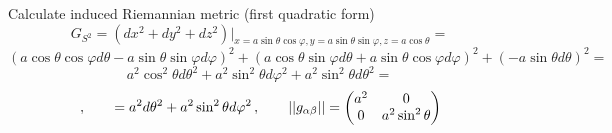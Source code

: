 \documentclass[12pt]{article}
\theoremstyle{theorem}
\numberwithin{equation}{section}
\begin{document}
   Calculate induced Riemannian metric (first quadratic form)
              $$
              G_{S^2}=\left(dx^2+dy^2+dz^2\right)\big\vert_{x=a\sin\theta\cos\varphi,y=a\sin\theta\sin\varphi,
              z=a\cos\theta}=
                      $$
                      $$
                      (a\cos\theta\cos\varphi d\theta-a\sin\theta\sin\varphi d\varphi)^2+
                      (a\cos\theta\sin\varphi d\theta+a\sin\theta\cos\varphi d\varphi)^2+
                         (-a\sin\theta d\theta)^2=
                      $$
                      $$
          a^2\cos^2\theta d\theta^2+a^2\sin^2\theta d\varphi^2+a^2\sin^2\theta d\theta^2=
                      $$
        \begin{equation}\label{firtsquadraticformforsphere(diff)}\,,\qquad
             =a^2d\theta^2+a^2\sin^2\theta d\varphi^2\,,\qquad
                        ||g_{\alpha\beta}||=
   \begin{pmatrix}
   a^2 & 0 \\
   0&  a^2\sin^2\theta \\
   \end{pmatrix}
                       \end{equation}
\end{document}

